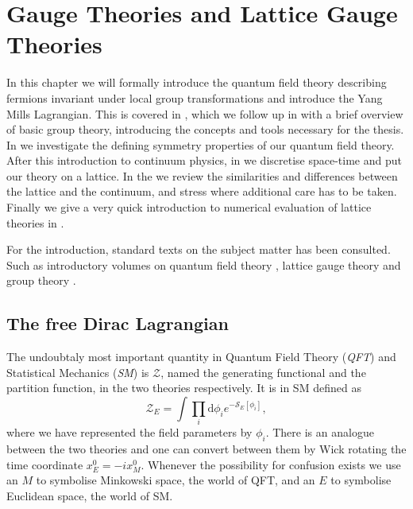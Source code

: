 \chapter{Gauge Theories and Lattice Gauge Theories}

In this chapter we will formally introduce the quantum field theory describing
fermions invariant under local group transformations and introduce the Yang
Mills Lagrangian. This is covered in , which we
follow up in  with a brief overview of basic group
theory, introducing the concepts and tools necessary for the thesis. In
 we investigate the defining symmetry properties of our
quantum field theory. After this introduction to continuum physics, in
 we discretise space-time and put our theory on a
lattice. In the  we review the
similarities and differences between the lattice and the continuum, and stress
where additional care has to be taken. Finally we give a very quick introduction
to numerical evaluation of lattice theories in .

For the introduction, standard texts on the subject matter has been consulted.
Such as introductory volumes on quantum field theory
\citep[e.g.][]{peskin1995introduction,maggiore2004modern}, lattice gauge theory
\citep[e.g.][]{montvay1997quantum,gattringer2009quantum} and group theory
\citep[e.g.][]{georgi1999lie,fulton2013representation}.

\section{The free Dirac Lagrangian} \label{sec:continuum_gauge}

The undoubtaly most important quantity in Quantum Field Theory (\emph{QFT}) and
Statistical Mechanics (\emph{SM}) is $\mathcal{Z}$, named the generating
functional and the partition function, in the two theories respectively. It is
in SM defined as
%
\begin{equation} \label{eq:partition}
  \mathcal{Z}_E = \int \prod_i \mathrm{d} \phi_i e^{-\mathcal{S}_E[\phi_i]},
\end{equation}
%
where we have represented the field parameters by $\phi_i$. There is an analogue
between the two theories and one can convert between them by Wick rotating the
time coordinate $x^0_E = -i x^0_M$. Whenever the possibility for confusion
exists we use an $M$ to symbolise Minkowski space, the world of QFT, and an $E$
to symbolise Euclidean space, the world of SM.

